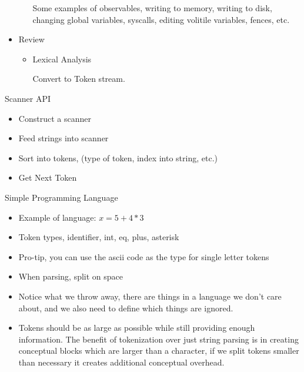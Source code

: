 \documentclass{report}
\begin{document}
\begin{description}
\begin{itemize}
\begin{itemize}
\begin{mdframed}
                            Some examples of observables, writing to memory, writing to disk,
                            changing global variables, syscalls, editing volitile variables,
                            fences, etc.
                        \end{mdframed}
                \end{itemize}
            \item Review
                \begin{itemize}
                    \item Lexical Analysis
                        \begin{mdframed}
                            Convert to Token stream.
                        \end{mdframed}
                \end{itemize}
        \end{itemize}
    \item Scanner API
        \begin{itemize}
            \item Construct a scanner
            \item Feed strings into scanner
            \item Sort into tokens, (type of token, index into string, etc.)
            \item Get Next Token
        \end{itemize}
    \item Simple Programming Language
        \begin{itemize}
            \item Example of language: $ x = 5 + 4 * 3 $
            \item Token types, identifier, int, eq, plus, asterisk
            \item Pro-tip, you can use the ascii code as the type for single letter tokens
            \item When parsing, split on space
            \item Notice what we throw away, there are things in a language we don't care about,
                and we also need to define which things are ignored.
            \item Tokens should be as large as possible while still providing enough information.
                The benefit of tokenization over just string parsing is in creating conceptual
                blocks which are larger than a character, if we split tokens smaller than necessary
                it creates additional conceptual overhead.
        \end{itemize}

\end{description}
\end{document}
